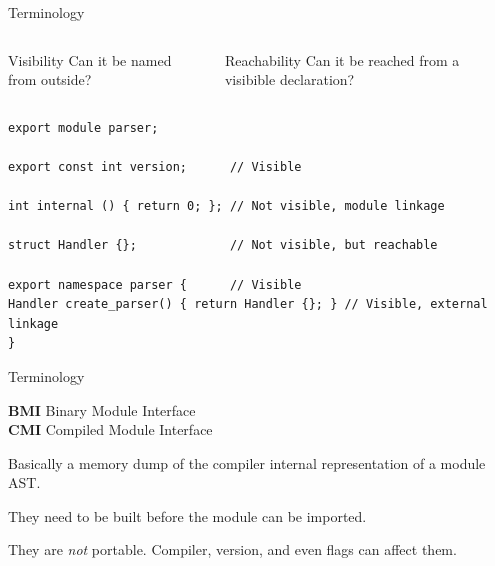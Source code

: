 \documentclass[]{beamer}
\begin{document}
\begin{frame}[containsverbatim]{Terminology}
  \begin{columns}
    \begin{column}{0.5\textwidth}
      \begin{block}{\footnotesize Visibility}
        \footnotesize Can it be named from outside?
      \end{block}
    \end{column}
    \begin{column}{0.5\textwidth}
      \begin{block}{\footnotesize Reachability}
        \footnotesize Can it be reached from a visibible declaration?
      \end{block}
    \end{column}

  \end{columns}

  \vspace{0.5em}

  \begin{verbatim}
export module parser;

export const int version;      // Visible

int internal () { return 0; }; // Not visible, module linkage

struct Handler {};             // Not visible, but reachable

export namespace parser {      // Visible
Handler create_parser() { return Handler {}; } // Visible, external linkage
}
  \end{verbatim}

  \vspace{0.5em}

  \small \cite{Engert21}

\end{frame}

\begin{frame}{Terminology}
  \begin{block}{}
    \textbf{BMI} Binary Module Interface \\
    \textbf{CMI} Compiled Module Interface

    \vspace{1em}

    Basically  a memory dump of the compiler internal representation of a module AST.

    They need to be built before the module can be imported.

    They are \emph{not} portable. Compiler, version, and even flags can affect them.
  \end{block}
\end{frame}
\end{document}
